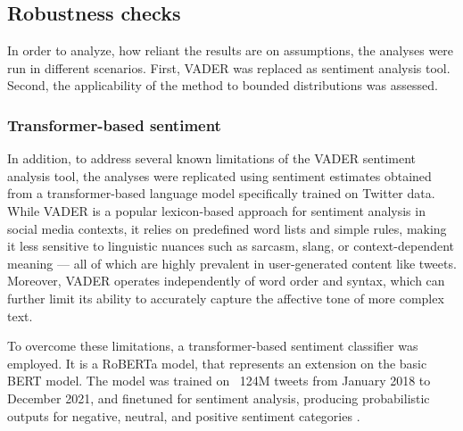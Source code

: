 \subsection{Robustness checks}

In order to analyze, how reliant the results are on assumptions, the analyses were run in different scenarios. First, VADER was replaced as sentiment analysis tool. Second, the applicability of the method to bounded distributions was assessed. 







\subsubsection{Transformer-based sentiment}

In addition, to address several known limitations of the VADER sentiment analysis tool, the analyses were replicated using sentiment estimates obtained from a transformer-based language model specifically trained on Twitter data. While VADER is a popular lexicon-based approach for sentiment analysis in social media contexts, it relies on predefined word lists and simple rules, making it less sensitive to linguistic nuances such as sarcasm, slang, or context-dependent meaning — all of which are highly prevalent in user-generated content like tweets. Moreover, VADER operates independently of word order and syntax, which can further limit its ability to accurately capture the affective tone of more complex text.

To overcome these limitations, a transformer-based sentiment classifier was employed. It is a RoBERTa \citep{liu2019roberta} model, that represents an extension on the basic BERT \citep{devlin2019bert} model. The model was trained on ~124M tweets from January 2018 to December 2021, and finetuned for sentiment analysis, producing probabilistic outputs for negative, neutral, and positive sentiment categories \citep{cardiff_sentiment}. 

